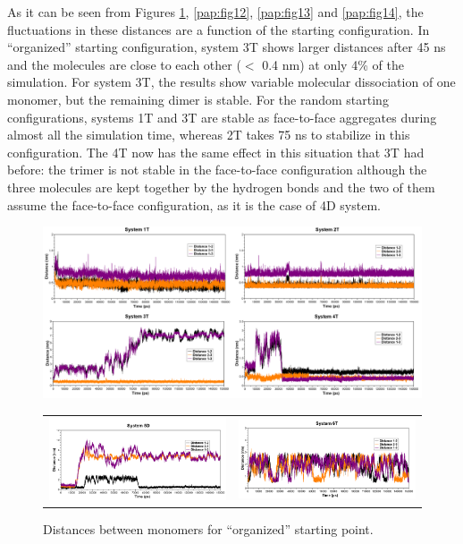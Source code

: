 As it can be seen from Figures \ref{pap:fig11}, \ref{pap:fig12}, \ref{pap:fig13} and \ref{pap:fig14}, the fluctuations in these distances are a function of the starting configuration. In ``organized'' starting configuration, system 3T shows larger distances after 45 ns and the molecules are close to each other ($<$ 0.4 nm) at only 4\% of the simulation. For system 3T, the results show variable molecular dissociation of one monomer, but the remaining dimer is stable. For the random starting configurations, systems 1T and 3T are stable as face-to-face aggregates during almost all the simulation time, whereas 2T takes 75 ns to stabilize in this configuration. The 4T now has the same effect in this situation that 3T had before: the trimer is not stable in the face-to-face configuration although the three molecules are kept together by the hydrogen bonds and the two of them assume the face-to-face configuration, as it is the case of 4D system. 

\begin{figure}[htb]
	\centering
	\includegraphics[width=\columnwidth]{image/Figure8} 
	\begin{tabular}{cc}
		\includegraphics[width=0.5\columnwidth]{image/Figure8b} &
		\includegraphics[width=0.5\columnwidth]{image/Figure8c} \\
	\end{tabular}
	\caption{Distances between monomers for ``organized'' starting point.}
	\label{pap:fig11}
\end{figure}

